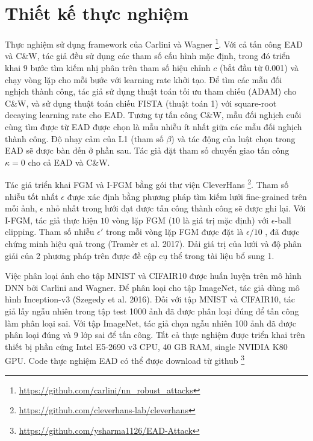 \section{Thiết kế thực nghiệm}
Thực nghiệm sử dụng framework của Carlini và Wagner \footnote{\href{https://github.com/carlini/nn_robust_attacks}{https://github.com/carlini/nn\_robust\_attacks}}. Với cả tấn công EAD và C\&W, tác giả đều sử dụng các tham số cấu hình mặc định, trong đó triển khai 9 bước tìm kiếm nhị phân trên tham số hiệu chỉnh $c$ (bắt đầu từ 0.001) và chạy  vòng lặp cho mỗi bước với learning rate khởi tạo. Để tìm các mẫu đối nghịch thành công, tác giả sử dụng thuật toán tối ưu tham chiếu (ADAM) cho C\&W, và sử dụng thuật toán chiếu FISTA (thuật toán 1) với square-root decaying learning rate cho EAD. Tương tự tấn công C\&W, mẫu đối nghịch cuối cùng tìm được từ EAD được chọn là mẫu nhiễu ít nhất giữa các mẫu đối nghịch thành công. Độ nhạy cảm của L1 (tham số $\beta$) và tác động của luật chọn trong EAD sẽ được bàn đến ở phần sau. Tác giả đặt tham số chuyển giao tấn công $\kappa = 0$ cho cả EAD và C\&W.


Tác giả triển khai FGM và I-FGM bằng gói thư viện CleverHans \footnote{\href{https://github.com/cleverhans-lab/cleverhans}{https://github.com/cleverhans-lab/cleverhans}}. Tham số nhiễu tốt nhất $\epsilon$ được xác định bằng phương pháp tìm kiếm lưới fine-grained trên mỗi ảnh, $\epsilon$ nhỏ nhất trong lưới đạt được tấn công thành công sẽ được ghi lại. Với I-FGM, tác giả thực hiện $10$ vòng lặp FGM ($10$ là giá trị mặc định) với $\epsilon$-ball clipping. Tham số nhiễu $\epsilon'$ trong mỗi vòng lặp FGM được đặt là $\epsilon/10$ , đã được chứng minh hiệu quả trong (Tramèr et al. 2017). Dải giá trị của lưới và độ phân giải của 2 phương pháp trên được đề cập cụ thể trong tài liệu bổ sung 1.

Việc phân loại ảnh cho tập MNIST và CIFAIR10 được huấn luyện trên mô hình DNN bởi Carlini and Wagner. Để phân loại cho tập ImageNet, tác giả dùng mô hình Inception-v3 (Szegedy et al. 2016). Đối với tập MNIST và CIFAIR10, tác giả lấy ngẫu nhiên trong tập test 1000 ảnh đã được phân loại đúng để tấn công làm phân loại sai. Với tập ImageNet, tác giả chọn ngẫu nhiên 100 ảnh đã được phân loại đúng và 9 lớp sai để tấn công. Tất cả thực nghiệm được triển khai trên thiết bị phần cứng Intel E5-2690 v3 CPU, 40 GB RAM, single NVIDIA K80 GPU. Code thực nghiệm EAD có thể được download từ github \footnote{\href{https://github.com/ysharma1126/EAD-Attack}{https://github.com/ysharma1126/EAD-Attack}}